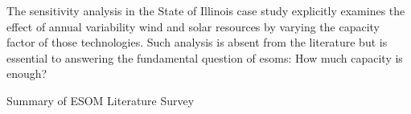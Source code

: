 The sensitivity analysis in the State of Illinois case study explicitly
examines the effect of annual variability wind and solar resources by varying
the capacity factor of those technologies. Such analysis is absent from the literature
but is essential to answering the fundamental question of \glspl{esom}: How much
capacity is enough?

  \begin{table}
    \centering
    \caption{Summary of ESOM Literature Survey}
    \label{tab:esom_lit}
    \resizebox{\textwidth}{!}{}
  \end{table}



